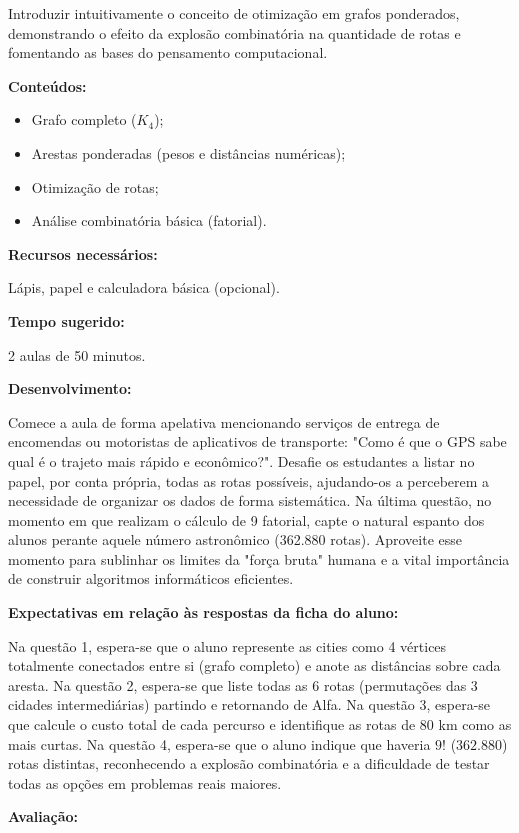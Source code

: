 \documentclass[
  12pt,
  oneside,
  a4paper,
  english,
  brazilian
  ]{abntex2}
\theoremstyle{definition}
\begin{document}
\begin{apendicesenv}
Introduzir intuitivamente o conceito de otimização em grafos ponderados, demonstrando o efeito da explosão combinatória na quantidade de rotas e fomentando as bases do pensamento computacional.

\textbf{Conteúdos:}

\begin{itemize}[noitemsep]
  \item Grafo completo ($K_4$);
  \item Arestas ponderadas (pesos e distâncias numéricas);
  \item Otimização de rotas;
  \item Análise combinatória básica (fatorial).
\end{itemize}

\textbf{Recursos necessários:}

Lápis, papel e calculadora básica (opcional).

\textbf{Tempo sugerido:}

2 aulas de 50 minutos.

\textbf{Desenvolvimento:}

Comece a aula de forma apelativa mencionando serviços de entrega de encomendas ou motoristas de aplicativos de transporte: "Como é que o GPS sabe qual é o trajeto mais rápido e econômico?". Desafie os estudantes a listar no papel, por conta própria, todas as rotas possíveis, ajudando-os a perceberem a necessidade de organizar os dados de forma sistemática. Na última questão, no momento em que realizam o cálculo de 9 fatorial, capte o natural espanto dos alunos perante aquele número astronômico (362.880 rotas). Aproveite esse momento para sublinhar os limites da "força bruta" humana e a vital importância de construir algoritmos informáticos eficientes.

\textbf{Expectativas em relação às respostas da ficha do aluno:}

Na questão 1, espera-se que o aluno represente as cities como 4 vértices totalmente conectados entre si (grafo completo) e anote as distâncias sobre cada aresta. Na questão 2, espera-se que liste todas as 6 rotas (permutações das 3 cidades intermediárias) partindo e retornando de Alfa. Na questão 3, espera-se que calcule o custo total de cada percurso e identifique as rotas de 80 km como as mais curtas. Na questão 4, espera-se que o aluno indique que haveria $9!$ ($362.880$) rotas distintas, reconhecendo a explosão combinatória e a dificuldade de testar todas as opções em problemas reais maiores.

\textbf{Avaliação:}


\end{apendicesenv}
\end{document}
